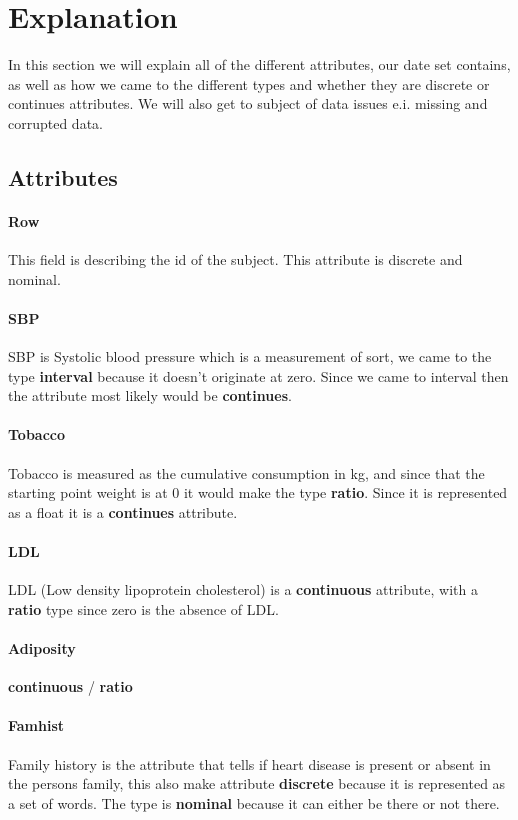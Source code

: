 \section{Explanation}

In this section we will explain all of the different attributes, our date set contains, as well as how we came to the different types and whether they are discrete or continues attributes. We will also get to subject of data issues e.i. missing and corrupted data.

\subsection{Attributes}

\paragraph{Row} This field is describing the id of the subject. This attribute is discrete and nominal.

\paragraph{SBP} SBP is Systolic blood pressure which is a measurement of sort, we came to the type \textbf{interval} because it doesn't originate at zero. Since we came to interval then the attribute most likely would be \textbf{continues}.

\paragraph{Tobacco} Tobacco is measured as the cumulative consumption in kg, and since that the starting point weight is at 0 it would make the type \textbf{ratio}. Since it is represented as a float it is a \textbf{continues} attribute.

\paragraph{LDL} LDL (Low density lipoprotein cholesterol) is a \textbf{continuous} attribute, with a \textbf{ratio} type since zero is the absence of LDL.

\paragraph{Adiposity} \textbf{continuous} / \textbf{ratio}

\paragraph{Famhist} Family history is the attribute that tells if heart disease is present or absent in the persons family, this also make attribute \textbf{discrete} because it is represented as a set of words. The type is \textbf{nominal} because it can either be there or not there.

